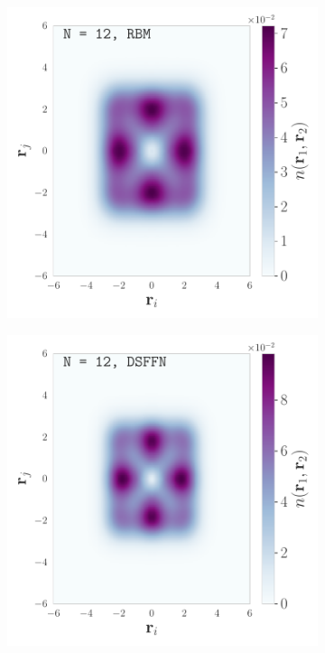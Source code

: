 \begin{figure}[H]
\begin{subfigure}[t]{0.32\textwidth}
        \hspace{-1cm}
    \end{subfigure}
    \begin{subfigure}[t]{0.32\textwidth}
        \centering
        \includegraphics[width=\textwidth]{Chapters/Results/dots/two_body_density_N[12]_nqs_RBM_0.5.pdf}
        \hspace{-1cm}
    \end{subfigure}
    \begin{subfigure}[t]{0.32\textwidth}
        \centering
        \includegraphics[width=\textwidth]{Chapters/Results/dots/two_body_density_N[12]_nqs_DSFFN_0.5.pdf}

\end{subfigure}
\end{figure}
